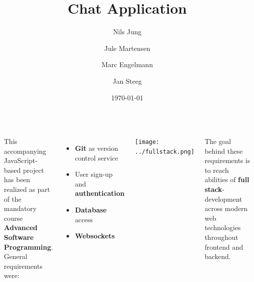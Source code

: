 \documentclass[20pt, a1paper]{tikzposter}
\title{Chat Application}
\author{Nils Jung}
\author{Jule Martensen}
\author{Marc Engelmann}
\author{Jan Steeg}
\affil{University of Applied Sciences Kiel}
\date{\today}
\makeatletter
\def\maketitle{\AB@maketitle}
\makeatother
\begin{document}
	\maketitle
	
	\begin{columns}
	{
		This accompanying JavaScript-based project has been realized as part of the mandatory course \textbf{Advanced Software Programming}.\\
		General requirements were:\\
		

	
		\begin{minipage}{0.55\linewidth}
			\begin{itemize}
				\item \textbf{Git} as version control service
				\item User sign-up and \textbf{authentication}
				\item \textbf{Database} access
				\item \textbf{Websockets}\\
			\end{itemize}
		\end{minipage}
		\begin{minipage}{0.45\linewidth}
		 \begin{tikzfigure}
		 	\texttt{[image: ../fullstack.png]}
		 \end{tikzfigure}
		\end{minipage}
	\vspace{1.5cm}
		
		The goal behind these requirements is to reach abilities of \textbf{full stack}-development across modern web technologies throughout frontend and backend.\\
	}

	{
		
		

	}

	\end{columns}
	
\end{document}
